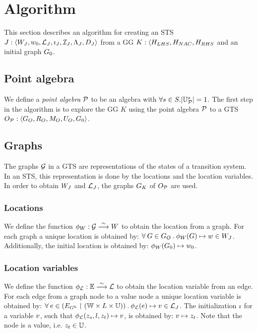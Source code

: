 \section{Algorithm}
This section describes an algorithm for creating an STS $J: \langle W_J,w_0,\mathcal{L}_J,\imath_J,\mathcal{I}_J,\Lambda_J,D_J\rangle$ from a GG $K: \langle H_{LHS}, H_{NAC}, H_{RHS}$ and an initial graph $G_0$. 

\subsection{Point algebra}
We define a \textit{point algebra} $\mathcal{P}$ to be an algebra with $\forall s \in S . |\mathbb{U}_{\mathcal{P}}^s| = 1$. The first step in the algorithm is to explore the GG $K$ using the point algebra $\mathcal{P}$ to a GTS $O_{\mathcal{P}}: \langle G_O, R_O, M_O, U_O, G_0 \rangle$.

\subsection{Graphs}
The graphs $\mathcal{G}$ in a GTS are representations of the states of a transition system. In an STS, this representation is done by the locations and the location variables. In order to obtain $W_J$ and $\mathcal{L}_J$, the graphs $G_K$ of $O_{\mathcal{P}}$ are used.

\subsubsection{Locations}
We define the function $\phi_W: \mathcal{G} \stackrel{\sim}{\longrightarrow} W$ to obtain the location from a graph. For each graph a unique location is obtained by: $\forall\: G \in G_O\: .\:\phi_W(G) \mapsto w \in W_J$. Additionally, the initial location is obtained by: $\phi_W(G_0) \mapsto w_0$.

\subsubsection{Location variables}
We define the function $\phi_{\mathcal{L}}: \mathbb{E} \stackrel{\sim}{\longrightarrow} \mathcal{L}$ to obtain the location variable from an edge. For each edge from a graph node to a value node a unique location variable is obtained by: $\forall\: e \in (E_{G^h}\restriction(\mathbb{W} \times L \times \mathbb{U}))\: .\: \phi_{\mathcal{L}}(e) \mapsto v \in \mathcal{L}_J$. The initialization $\imath$ for a variable $v$, such that $\phi_{\mathcal{L}}(z_s, l, z_t) \mapsto v$, is obtained by: $v \mapsto z_t$. Note that the node is a value, i.e. $z_t \in \mathbb{U}$.

